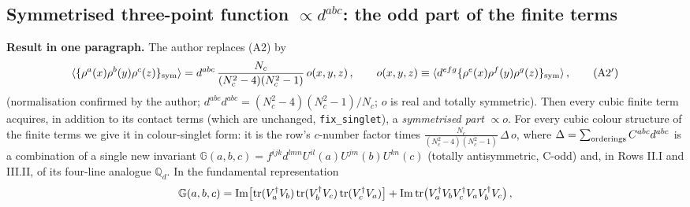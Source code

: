 \documentclass[10pt]{article}
\def\mf#1{\mathbb{#1}}
\begin{document}
\subsection{Symmetrised three-point function $\propto d^{abc}$: the odd part of the finite terms}\label{sec:dabc}
\noindent\textbf{Result in one paragraph.} The author replaces (A2) by
\begin{align}
\langle\{\rho^{a}(x)\rho^{b}(y)\rho^{c}(z)\}_{\rm sym}\rangle=d^{abc}\,\frac{N_{c}}{(N_{c}^{2}-4)(N_{c}^{2}-1)}\,o(x,y,z)\,,\qquad o(x,y,z)\equiv\langle d^{efg}\{\rho^{e}(x)\rho^{f}(y)\rho^{g}(z)\}_{\rm sym}\rangle\,,\tag{A2$'$}
\end{align}
(normalisation confirmed by the author; $d^{abc}d^{abc}=(N_{c}^{2}-4)(N_{c}^{2}-1)/N_{c}$; $o$ is real and totally symmetric). Then every cubic finite term acquires, in addition to its contact terms (which are unchanged, \texttt{fix\_singlet}), a \emph{symmetrised part} $\propto o$. For every cubic colour structure of the finite terms we give it in colour-singlet form: it is the row's $c$-number factor times $\frac{N_{c}}{(N_{c}^{2}-4)(N_{c}^{2}-1)}\,\Delta\,o$, where $\Delta=\sum_{\rm orderings}C^{abc}d^{abc}$ is a combination of a single new invariant $\mf{G}(a,b,c)=f^{ijk}d^{lmn}U^{il}(a)U^{jm}(b)U^{kn}(c)$ (totally antisymmetric, C-odd) and, in Rows II.I and III.II, of its four-line analogue $\mf{Q}_{d}$. In the fundamental representation
\begin{align}
\mf{G}(a,b,c)={\rm Im}\big[{\rm tr}(V_{a}^{\dagger}V_{b})\,{\rm tr}(V_{b}^{\dagger}V_{c})\,{\rm tr}(V_{c}^{\dagger}V_{a})\big]+{\rm Im}\,{\rm tr}\big(V_{a}^{\dagger}V_{b}V_{c}^{\dagger}V_{a}V_{b}^{\dagger}V_{c}\big)\,,\notag
\end{align}
\end{document}
